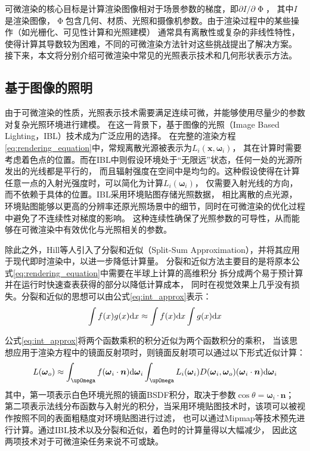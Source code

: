 可微渲染的核心目标是计算渲染图像相对于场景参数的梯度，即${\partial I}/{\partial \upPhi}$，
其中$I$是渲染图像，$\upPhi$包含几何、材质、光照和摄像机参数。由于渲染过程中的某些操作（如光栅化、可见性计算和光照建模）
通常具有离散性或复杂的非线性特性，使得计算其导数较为困难，不同的可微渲染方法针对这些挑战提出了解决方案。
接下来，本文将分别介绍可微渲染中常见的光照表示技术和几何形状表示方法。

\subsection{基于图像的照明} \label{sec:IBL}
由于可微渲染的性质，光照表示技术需要满足连续可微，并能够使用尽量少的参数对复杂光照环境进行建模。
在这一背景下，基于图像的光照（Image Based Lighting，IBL）技术成为广泛应用的选择。
在完整的渲染方程\eqref{eq:rendering_equation}中，常规离散光源被表示为$L_i(\boldsymbol{x},{\boldsymbol{\omega}}_i)$，
其在计算时需要考虑着色点的位置。而在IBL中则假设环境处于“无限远”状态，任何一处的光源所发出的光线都是平行的，
而且辐射强度在空间中是均匀的。这种假设使得在计算任意一点的入射光强度时，可以简化为计算$L_i({\boldsymbol{\omega}}_i)$，
仅需要入射光线的方向，而不依赖于具体的位置。IBL采用环境贴图存储光照数据，
相比离散的点光源，环境贴图能够以更高的分辨率还原光照场景中的细节，同时在可微渲染的优化过程中避免了不连续性对梯度的影响。
这种连续性确保了光照参数的可导性，从而能够在可微渲染中有效优化与光照相关的参数。

除此之外，Hill等人\cite{Hill_2014}引入了分裂和近似（Split-Sum Approximation），并将其应用于现代即时渲染中，以进一步降低计算量。
分裂和近似方法主要目的是将原本公式\eqref{eq:rendering_equation}中需要在半球上计算的高维积分
拆分成两个易于预计算并在运行时快速查表获得的部分以降低计算成本，
同时在视觉效果上几乎没有损失。分裂和近似的思想可以由公式\eqref{eq:int_approx}表示：
\begin{equation}
  \int f(x)g(x){\rm{d}}x\approx \int{f(x){\rm{d}}x} \int{g(x){\rm{d}}x}
  \label{eq:int_approx}
\end{equation}

公式\eqref{eq:int_approx}将两个函数乘积的积分近似为两个函数积分的乘积，
当该思想应用于渲染方程中的镜面反射项时，则镜面反射项可以通过以下形式近似计算：
\begin{equation}
  L({\boldsymbol{\omega}}_o)\approx 
  \int_{\upOmega}{f({\boldsymbol{\omega}}_i\cdot{\boldsymbol{n}}){\rm{d}}{\boldsymbol{\omega}}_i}
  \int_{\upOmega}{L_i({\boldsymbol{\omega}}_i)D({\boldsymbol{\omega}}_i,{\boldsymbol{\omega}}_o)({\boldsymbol{\omega}}_i\cdot{\boldsymbol{n}}){\rm{d}}{\boldsymbol{\omega}}_i}
  \label{eq:L_omega_o_approx}
\end{equation}
其中，第一项表示白色环境光照的镜面BSDF积分，取决于参数$\cos{\theta}={\boldsymbol{\omega}}_i\cdot{\boldsymbol{n}}；$
第二项表示法线分布函数与入射光的积分，当采用环境贴图技术时，该项可以被视作按照不同的表面粗糙度对环境贴图进行过滤，
也可以通过Mipmap等技术预先进行计算。通过IBL技术以及分裂和近似，着色时的计算量得以大幅减少，
因此这两项技术对于可微渲染任务来说不可或缺。


